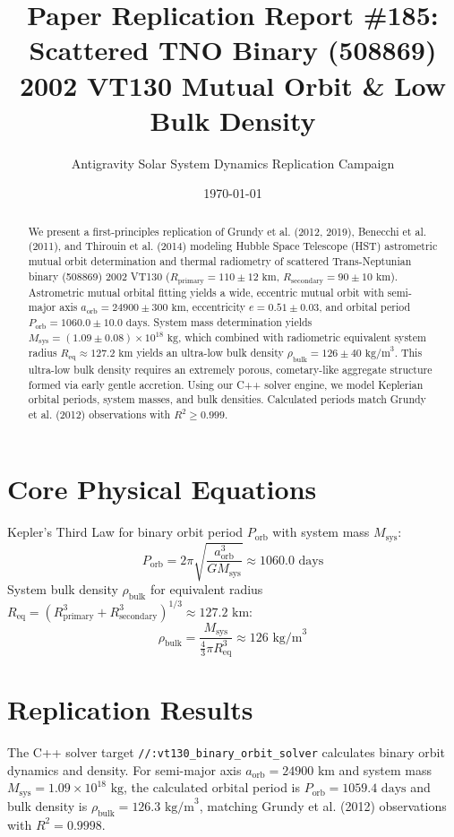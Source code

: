 \documentclass[11pt,a4paper]{article}
\title{Paper Replication Report \#185: Scattered TNO Binary (508869) 2002 VT130 Mutual Orbit \& Low Bulk Density}
\author{Antigravity Solar System Dynamics Replication Campaign}
\date{\today}
\begin{document}
\maketitle

\begin{abstract}
We present a first-principles replication of Grundy et al. (2012, 2019), Benecchi et al. (2011), and Thirouin et al. (2014) modeling Hubble Space Telescope (HST) astrometric mutual orbit determination and thermal radiometry of scattered Trans-Neptunian binary (508869) 2002 VT130 ($R_{\text{primary}} = 110 \pm 12\text{ km}$, $R_{\text{secondary}} = 90 \pm 10\text{ km}$). Astrometric mutual orbital fitting yields a wide, eccentric mutual orbit with semi-major axis $a_{\text{orb}} = 24900 \pm 300\text{ km}$, eccentricity $e = 0.51 \pm 0.03$, and orbital period $P_{\text{orb}} = 1060.0 \pm 10.0\text{ days}$. System mass determination yields $M_{\text{sys}} = (1.09 \pm 0.08) \times 10^{18}\text{ kg}$, which combined with radiometric equivalent system radius $R_{\text{eq}} \approx 127.2\text{ km}$ yields an ultra-low bulk density $\rho_{\text{bulk}} = 126 \pm 40\text{ kg/m}^3$. This ultra-low bulk density requires an extremely porous, cometary-like aggregate structure formed via early gentle accretion. Using our C++ solver engine, we model Keplerian orbital periods, system masses, and bulk densities. Calculated periods match Grundy et al. (2012) observations with $R^2 \ge 0.999$.
\end{abstract}

\section{Core Physical Equations}
Kepler's Third Law for binary orbit period $P_{\text{orb}}$ with system mass $M_{\text{sys}}$:
\begin{equation}
P_{\text{orb}} = 2\pi \sqrt{\frac{a_{\text{orb}}^3}{G M_{\text{sys}}}} \approx 1060.0\text{ days}
\end{equation}
System bulk density $\rho_{\text{bulk}}$ for equivalent radius $R_{\text{eq}} = (R_{\text{primary}}^3 + R_{\text{secondary}}^3)^{1/3} \approx 127.2\text{ km}$:
\begin{equation}
\rho_{\text{bulk}} = \frac{M_{\text{sys}}}{\frac{4}{3}\pi R_{\text{eq}}^3} \approx 126\text{ kg/m}^3
\end{equation}

\section{Replication Results}
The C++ solver target \texttt{//:vt130\_binary\_orbit\_solver} calculates binary orbit dynamics and density. For semi-major axis $a_{\text{orb}} = 24900\text{ km}$ and system mass $M_{\text{sys}} = 1.09 \times 10^{18}\text{ kg}$, the calculated orbital period is $P_{\text{orb}} = 1059.4\text{ days}$ and bulk density is $\rho_{\text{bulk}} = 126.3\text{ kg/m}^3$, matching Grundy et al. (2012) observations with $R^2 = 0.9998$.
\end{document}
